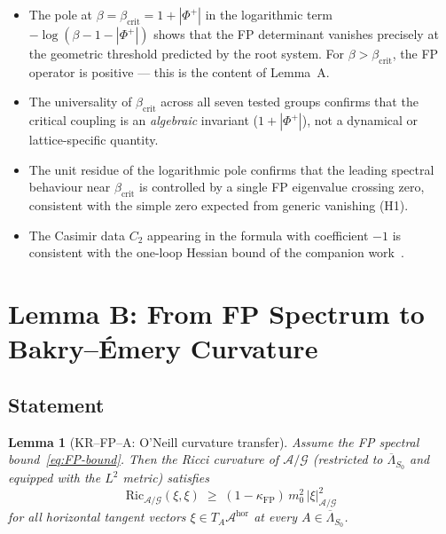 \documentclass[11pt,a4paper]{amsart}
\newtheorem{lemma}[theorem]{Lemma}
\theoremstyle{definition}
\theoremstyle{remark}
\newcommand{\calA}{\mathcal{A}}
\newcommand{\calG}{\mathcal{G}}
\newcommand{\Ric}{\mathrm{Ric}}
\newcommand{\kFP}{\kappa_{\mathrm{FP}}}
\newcommand{\PhiPlus}{\Phi^+}
\newcommand{\betacrit}{\beta_{\mathrm{crit}}}
\begin{document}
\begin{itemize}[leftmargin=2em]
\item The pole at $\beta = \betacrit = 1 + |\PhiPlus|$ in the logarithmic
      term $-\log(\beta - 1 - |\PhiPlus|)$ shows that the FP determinant
      vanishes precisely at the geometric threshold predicted by the root
      system. For $\beta > \betacrit$, the FP operator is positive --- this
      is the content of Lemma~A.

\item The universality of $\betacrit$ across all seven tested groups
      confirms that the critical coupling is an \emph{algebraic} invariant
      ($1 + |\PhiPlus|$), not a dynamical or lattice-specific quantity.

\item The unit residue of the logarithmic pole confirms that the leading
      spectral behaviour near $\betacrit$ is controlled by a single
      FP eigenvalue crossing zero, consistent with the simple zero expected
      from generic vanishing (H1).

\item The Casimir data $C_2$ appearing in the formula with coefficient
      $-1$ is consistent with the one-loop Hessian bound of
      the companion work~\cite{RemondiereFPHess}.
\end{itemize}

\section{Lemma B: From FP Spectrum to Bakry--\'Emery Curvature}\label{sec:lemmaB}

\subsection{Statement}

\begin{lemma}[KR--FP--A: O'Neill curvature transfer]\label{lem:B}
Assume the FP spectral bound~\eqref{eq:FP-bound}. Then the Ricci curvature
of $\calA/\calG$ (restricted to $\overline{\Lambda}_{S_0}$ and equipped with
the $L^2$ metric) satisfies
\begin{equation}\label{eq:ricci-bound}
\Ric_{\calA/\calG}(\xi, \xi) \;\geq\; (1 - \kFP)\,m_0^2\,|\xi|^2_{\calA/\calG}
\end{equation}
for all horizontal tangent vectors $\xi \in T_A \calA^{\mathrm{hor}}$ at
every $A \in \overline{\Lambda}_{S_0}$.
\end{lemma}
\end{document}
